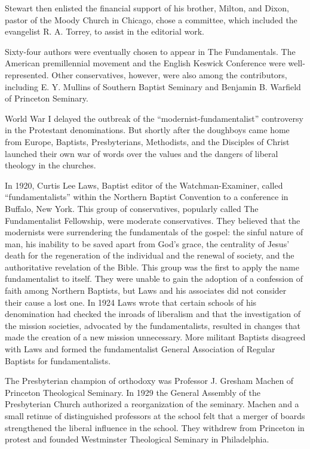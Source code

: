 Stewart then enlisted the financial support of his brother, Milton, and Dixon, pastor of the Moody
Church in Chicago, chose a committee, which included the evangelist R. A. Torrey, to assist in the
editorial work.

Sixty-four authors were eventually chosen to appear in The Fundamentals. The American premillennial
movement and the English Keswick Conference were well-represented. Other conservatives, however,
were also among the contributors, including E. Y. Mullins of Southern Baptist Seminary and Benjamin
B. Warfield of Princeton Seminary.

World War I delayed the outbreak of the “modernist-fundamentalist” controversy in the Protestant
denominations. But shortly after the doughboys came home from Europe, Baptists, Presbyterians,
Methodists, and the Disciples of Christ launched their own war of words over the values and the
dangers of liberal theology in the churches.

In 1920, Curtis Lee Laws, Baptist editor of the Watchman-Examiner, called “fundamentalists” within
the Northern Baptist Convention to a conference in Buffalo, New York. This group of conservatives,
popularly called The Fundamentalist Fellowship, were moderate conservatives. They believed that the
modernists were surrendering the fundamentals of the gospel: the sinful nature of man, his inability
to be saved apart from God’s grace, the centrality of Jesus’ death for the regeneration of the
individual and the renewal of society, and the authoritative revelation of the Bible. This group was
the first to apply the name fundamentalist to itself. They were unable to gain the adoption of a
confession of faith among Northern Baptists, but Laws and his associates did not consider their
cause a lost one. In 1924 Laws wrote that certain schools of his denomination had checked the
inroads of liberalism and that the investigation of the mission societies, advocated by the
fundamentalists, resulted in changes that made the creation of a new mission unnecessary. More
militant Baptists disagreed with Laws and formed the fundamentalist General Association of Regular
Baptists for fundamentalists.

The Presbyterian champion of orthodoxy was Professor J. Gresham Machen of Princeton Theological
Seminary. In 1929 the General Assembly of the Presbyterian Church authorized a reorganization of the
seminary. Machen and a small retinue of distinguished professors at the school felt that a merger of
boards strengthened the liberal influence in the school. They withdrew from Princeton in protest and
founded Westminster Theological Seminary in Philadelphia.

